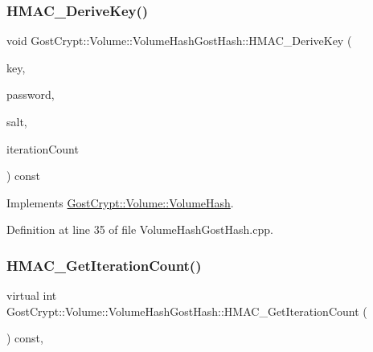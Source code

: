 \subsubsection{\texorpdfstring{H\+M\+A\+C\+\_\+\+Derive\+Key()}{HMAC\_DeriveKey()}}
{\footnotesize\ttfamily void Gost\+Crypt\+::\+Volume\+::\+Volume\+Hash\+Gost\+Hash\+::\+H\+M\+A\+C\+\_\+\+Derive\+Key (\begin{DoxyParamCaption}\item[{const \hyperlink{class_gost_crypt_1_1_buffer_ptr}{Buffer\+Ptr} \&}]{key,  }\item[{const \hyperlink{class_gost_crypt_1_1_volume_1_1_volume_password}{Volume\+Password} \&}]{password,  }\item[{const \hyperlink{class_gost_crypt_1_1_buffer_ptr}{Buffer\+Ptr} \&}]{salt,  }\item[{int}]{iteration\+Count }\end{DoxyParamCaption}) const\hspace{0.3cm}{\ttfamily [virtual]}}



Implements \hyperlink{class_gost_crypt_1_1_volume_1_1_volume_hash_a6804d6896491ea8c0a7be6600b6d7113}{Gost\+Crypt\+::\+Volume\+::\+Volume\+Hash}.



Definition at line 35 of file Volume\+Hash\+Gost\+Hash.\+cpp.

\mbox{\label{class_gost_crypt_1_1_volume_1_1_volume_hash_gost_hash_aa77576ae688b9ca4f419dbf093ef6a75}} 
\subsubsection{\texorpdfstring{H\+M\+A\+C\+\_\+\+Get\+Iteration\+Count()}{HMAC\_GetIterationCount()}}
{\footnotesize\ttfamily virtual int Gost\+Crypt\+::\+Volume\+::\+Volume\+Hash\+Gost\+Hash\+::\+H\+M\+A\+C\+\_\+\+Get\+Iteration\+Count (\begin{DoxyParamCaption}{ }\end{DoxyParamCaption}) const\hspace{0.3cm}{\ttfamily [inline]}, {\ttfamily [virtual]}}



